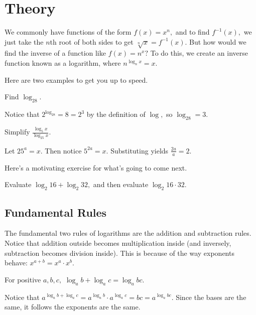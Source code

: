\section{Theory}
We commonly have functions of the form $f(x)=x^n,$ and to find $f^{-1}(x),$ we just take the $n$th root of both sides to get $\sqrt[n]{x}=f^{-1}(x).$ But how would we find the inverse of a function like $f(x)=n^x?$ To do this, we create an inverse function known as a logarithm, where $n^{\log_nx}=x.$

Here are two examples to get you up to speed.

\begin{exam}
Find $\log_28.$
\end{exam}

\begin{sol} Notice that $2^{\log_28}=8=2^3$ by the definition of $\log,$ so $\log_28=3.$\end{sol}
    
\begin{exam}
Simplify $\frac{\log_5x}{\log_{25}x}.$
\end{exam}
    
\begin{sol}
Let $25^a=x.$ Then notice $5^{2a}=x.$ Substituting yields $\frac{2a}{a}=2.$
\end{sol}

Here's a motivating exercise for what's going to come next.

\begin{exer}
Evaluate $\log_2{16}+\log_2{32},$ and then evaluate $\log_2{16\cdot 32}.$
\end{exer}

\subsection{Fundamental Rules}
The fundamental two rules of logarithms are the addition and subtraction rules. Notice that addition outside becomes multiplication inside (and inversely, subtraction becomes division inside). This is because of the way exponents behave: $x^{a+b}=x^a\cdot x^b.$

\begin{theo}
For positive $a,b,c,$ $\log_{a}b+\log_{a}c=\log_{a}{bc}.$
\end{theo}

\begin{pro}
Notice that $a^{\log_ab+\log_ac}=a^{\log_ab}\cdot a^{\log_ac}=bc=a^{\log_abc}.$ Since the bases are the same, it follows the exponents are the same.
\end{pro}

